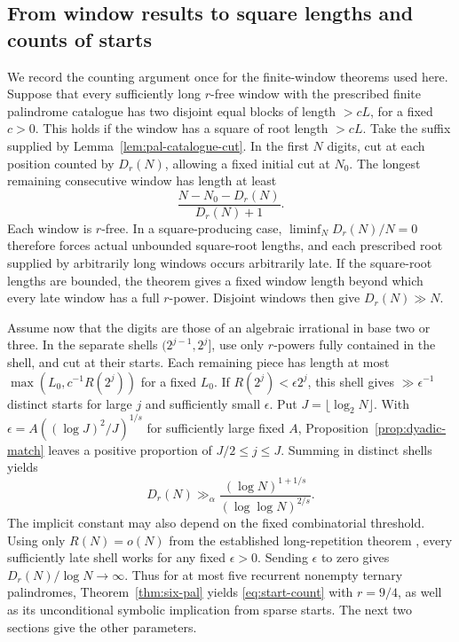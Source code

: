 \subsection{From window results to square lengths and counts of starts}

We record the counting argument once for the finite-window theorems used here. Suppose that every sufficiently long \(r\)-free window with the prescribed finite palindrome catalogue has two disjoint equal blocks of length \(>cL\), for a fixed \(c>0\). This holds if the window has a square of root length \(>cL\). Take the suffix supplied by Lemma~\ref{lem:pal-catalogue-cut}. In the first \(N\) digits, cut at each position counted by \(D_r(N)\), allowing a fixed initial cut at \(N_0\). The longest remaining consecutive window has length at least
\[
                    \frac{N-N_0-D_r(N)}{D_r(N)+1}.
\]
Each window is \(r\)-free. In a square-producing case, \(\liminf_ND_r(N)/N=0\) therefore forces actual unbounded square-root lengths, and each prescribed root supplied by arbitrarily long windows occurs arbitrarily late. If the square-root lengths are bounded, the theorem gives a fixed window length beyond which every late window has a full \(r\)-power. Disjoint windows then give \(D_r(N)\gg N\).

Assume now that the digits are those of an algebraic irrational in base two or three. In the separate shells \((2^{j-1},2^j]\), use only \(r\)-powers fully contained in the shell, and cut at their starts. Each remaining piece has length at most \(\max(L_0,c^{-1}R(2^j))\) for a fixed \(L_0\). If \(R(2^j)<\epsilon 2^j\), this shell gives \(\gg\epsilon^{-1}\) distinct starts for large \(j\) and sufficiently small \(\epsilon\). Put \(J=\lfloor\log_2 N\rfloor\). With \(\epsilon=A((\log J)^2/J)^{1/s}\) for sufficiently large fixed \(A\), Proposition~\ref{prop:dyadic-match} leaves a positive proportion of \(J/2\le j\le J\). Summing in distinct shells yields
\begin{equation}\label{eq:start-count}
        D_r(N)\gg_{\alpha}
        \frac{(\log N)^{1+1/s}}{(\log\log N)^{2/s}} .
\end{equation}
The implicit constant may also depend on the fixed combinatorial threshold. Using only \(R(N)=o(N)\) from the established long-repetition theorem \cite[Theorem~3.3]{Bilu}, every sufficiently late shell works for any fixed \(\epsilon>0\). Sending \(\epsilon\) to zero gives \(D_r(N)/\log N\to\infty\). Thus for at most five recurrent nonempty ternary palindromes, Theorem~\ref{thm:six-pal} yields \eqref{eq:start-count} with \(r=9/4\), as well as its unconditional symbolic implication from sparse starts. The next two sections give the other parameters.
